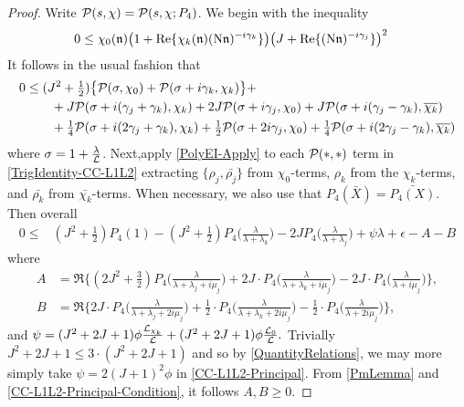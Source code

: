 \documentclass[12pt,psamsfonts]{amsart}
\theoremstyle{definition}
\theoremstyle{remark}
\numberwithin{equation}{section}
\begin{document}
\begin{proof} Write $\mathcal{P}(s,\chi) = \mathcal{P}(s, \chi; P_4)$. We begin with the inequality
\begin{align*}
0 & \leq \chi_0(\mathfrak{n}) \big(1+\mathrm{Re}\{ \chi_k(\mathfrak{n}) (\mathrm{N}\mathfrak{n})^{-i\gamma_k}\} \big) \big( J + \mathrm{Re}\{ (\mathrm{N}\mathfrak{n})^{-i\gamma_j} \} \big)^2 
\end{align*}
It follows in the usual fashion that
\begin{equation}
\begin{aligned}
0 & \leq(J^2+\tfrac{1}{2}) \big\{ \mathcal{P}(\sigma, \chi_0)  + \mathcal{P}(\sigma+i\gamma_k, \chi_k) \big\} + \\
& \qquad + J \mathcal{P}(\sigma + i(\gamma_j+\gamma_k), \chi_k) + 2J \mathcal{P}(\sigma+i\gamma_j, \chi_0) + J \mathcal{P}(\sigma+i(\gamma_j-\gamma_k), \overline{\chi_k}) \\
& \qquad + \tfrac{1}{4} \mathcal{P}(\sigma + i(2\gamma_j+\gamma_k), \chi_k) + \tfrac{1}{2} \mathcal{P}(\sigma+2i\gamma_j, \chi_0) + \tfrac{1}{4} \mathcal{P}(\sigma+i(2\gamma_j-\gamma_k), \overline{\chi_k}) \\
\end{aligned} 
\label{TrigIdentity-CC-L1L2}
\end{equation}
where $\sigma = 1 + \tfrac{\lambda}{\mathcal{L}}$. Next,apply \cref{PolyEI-Apply} to each $\mathcal{P}(\ast, \ast)$ term in \eqref{TrigIdentity-CC-L1L2} extracting $\{\rho_j, \bar{\rho_j}\}$  from $\chi_0$-terms, $\rho_k$ from the $\chi_k$-terms, and $\bar{\rho_k}$ from $\bar{\chi_k}$-terms. When necessary, we also use that $P_4(\bar{X}) = \bar{P_4(X)}$. Then  overall
\begin{equation}
\begin{aligned}
0 \leq & (J^2+\tfrac{1}{2}) P_4(1) -  (J^2+\tfrac{1}{2}) P_4\big( \frac{\lambda}{\lambda+\lambda_k} \big) - 2J P_4\big( \frac{\lambda}{\lambda+\lambda_j}\big) +  \psi  \lambda + \epsilon - A - B
\end{aligned}
\label{CC-L1L2-Principal}
\end{equation}
where 
\begin{align*}
A & = \Re\Big\{  (2J^2+\tfrac{3}{2}) P_4\big( \frac{\lambda}{\lambda+\lambda_j+i\mu_j} \big) + 2J \cdot P_4\big( \frac{\lambda}{\lambda+\lambda_k + i\mu_j}\big) - 2J \cdot P_4\big( \frac{\lambda}{\lambda+i\mu_j}\big)\Big\},  \\
B & = \Re\Big\{  2J \cdot P_4\big( \frac{\lambda}{\lambda+\lambda_j+2i\mu_j} \big) + \tfrac{1}{2} \cdot P_4\big( \frac{\lambda}{\lambda+\lambda_k + 2i\mu_j}\big) - \tfrac{1}{2} \cdot P_4\big( \frac{\lambda}{\lambda+2i\mu_j}\big)\Big\},
\end{align*}
and $\psi = (J^2 + 2J+1) \phi \tfrac{\mathcal{L}_{\chi_k}}{\mathcal{L}} + (J^2 + 2J + 1) \phi \tfrac{\mathcal{L}_0}{\mathcal{L}}.$ Trivially $J^2 + 2J+1 \leq 3 \cdot(J^2 + 2J+1)$ and so by \cref{QuantityRelations}, we may  more simply take $\psi =  2(J+1)^2 \phi$ in \eqref{CC-L1L2-Principal}. From \cref{PmLemma} and \eqref{CC-L1L2-Principal-Condition}, it follows $A,B \geq 0$.
\end{proof}
\end{document}
